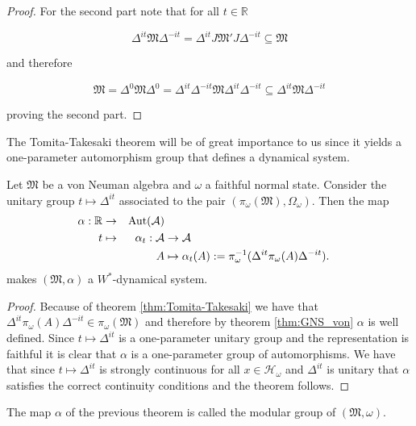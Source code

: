 \begin{proof}
For the second part note that for all $t\in\mathbb{R}$

\begin{equation}
\Delta^{it}\mathfrak{M}\Delta^{-it}=\Delta^{it}J\mathfrak{M}'J\Delta^{-it}\subseteq\mathfrak{M}
\end{equation}

and therefore

\begin{equation}
\mathfrak{M}=\Delta^0\mathfrak{M}\Delta^0=\Delta^{it}\Delta^{-it}\mathfrak{M}\Delta^{it}\Delta^{-it}\subseteq \Delta^{it}\mathfrak{M}\Delta^{-it}
\end{equation}

proving the second part.

\end{proof}

The Tomita-Takesaki theorem will be of great importance to us since it yields a one-parameter automorphism group that defines a dynamical system.

\begin{theorem}\label{thm:Dynamics_Tomita}
Let $\mathfrak{M}$ be a von Neuman algebra and $\omega$ a faithful normal state. Consider the unitary group $t\mapsto\Delta^{it}$ associated to the pair $(\pi_\omega(\mathfrak{M}),\Omega_\omega)$. Then the map
\begin{alignat}{2}
\alpha:\mathbb{R}&\rightarrow & \operatorname{Aut}(\mathcal{A}) \nonumber \\
t&\mapsto &\alpha_t:\mathcal{A} & \rightarrow\mathcal{A} \\
&&A&\mapsto \alpha_t(A):=\pi_\omega^{-1}(\Delta^{it}\pi_\omega(A)\Delta^{-it}). \nonumber
\end{alignat}
makes $(\mathfrak{M},\alpha)$ a $W^*$-dynamical system.
\end{theorem}

\begin{proof}
Because of theorem \ref{thm:Tomita-Takesaki} we have that $\Delta^{it}\pi_\omega(A)\Delta^{-it}\in\pi_\omega(\mathfrak{M})$ and therefore by theorem \ref{thm:GNS_von} $\alpha$ is well defined. Since $t\mapsto\Delta^{it}$ is a one-parameter unitary group and the representation is faithful it is clear that $\alpha$ is a one-parameter group of automorphisms. We have that since $t\mapsto\Delta^{it}$ is strongly continuous for all $x\in\mathcal{H}_\omega$ and $\Delta^{it}$ is unitary that $\alpha$ satisfies the correct continuity conditions and the theorem follows.
\end{proof}

\begin{definition}
The map $\alpha$ of the previous theorem is called the modular group of $(\mathfrak{M},\omega)$.
\end{definition}